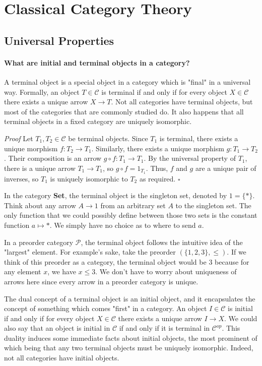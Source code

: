 \documentclass{article}
\begin{document}
\section{Classical Category Theory}

\subsection{Universal Properties}

\paragraph{What are initial and terminal objects in a category?}

A terminal object is a special object in a category which is "final" in a
universal way. Formally, an object \(T \in \mathcal{C}\) is terminal if and
only if for every object \(X \in \mathcal{C}\) there exists a unique arrow \(X
\to T\). Not all categories have terminal objects, but most of the categories
that are commonly studied do. It also happens that all terminal objects in a
fixed category are uniquely isomorphic.

\textit{Proof} \: Let \(T_1, T_2 \in \mathcal{C}\) be terminal objects. Since
\(T_1\) is terminal, there exists a unique morphism \(f : T_2 \to T_1\).
Similarly, there exists a unique morphism \(g : T_1 \to T_2\). Their
composition is an arrow \(g \circ f : T_1 \to T_1\). By the universal property
of \(T_1\), there is a unique arrow \(T_1 \to T_1\), so \(g \circ f =
1_{T_1}\). Thus, \(f\) and \(g\) are a unique pair of inverses, so \(T_1\) is
uniquely isomorphic to \(T_2\) as required. \(\square\)

In the category \textbf{Set}, the terminal object is the singleton set, denoted
by \(1 = \{*\}\). Think about any arrow \(A \to 1\) from an arbitrary set \(A\)
to the singleton set. The only function that we could possibly define between
those two sets is the constant function \(a \mapsto *\). We simply have no
choice as to where to send \(a\).

In a preorder category \(\mathcal{P}\), the terminal object follows the
intuitive idea of the "largest" element. For example's sake, take the preorder
\((\{1, 2, 3\}, \leq)\). If we think of this preorder as a category, the
terminal object would be \(3\) because for any element \(x\), we have \(x \leq
3\). We don't have to worry about uniqueness of arrows here since every arrow
in a preorder category is unique.

The dual concept of a terminal object is an initial object, and it encapsulates
the concept of something which comes "first" in a category. An object \(I \in
\mathcal{C}\) is initial if and only if for every object \(X \in \mathcal{C}\)
there exists a unique arrow \(I \to X\). We could also say that an object is
initial in \(\mathcal{C}\) if and only if it is terminal in
\(\mathcal{C}^{op}\). This duality induces some immediate facts about initial
objects, the most prominent of which being that any two terminal objects must
be uniquely isomorphic. Indeed, not all categories have initial objects.
\end{document}
